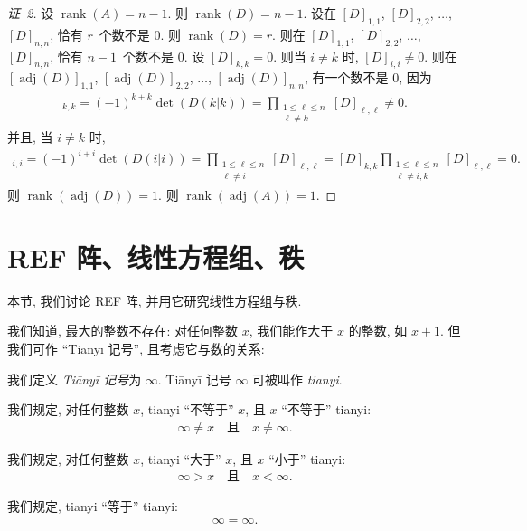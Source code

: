 \documentclass[../libro.tex]{subfiles}
\begin{document}
\begin{proof}[证~2]
    设 \(\operatorname{rank} {(A)} = n - 1\).
    则 \(\operatorname{rank} {(D)} = n - 1\).
    设在
    \([D]_{1,1}\), \([D]_{2,2}\), \(\dots\), \([D]_{n,n}\),
    恰有 \(r\)~个数不是 \(0\).
    则 \(\operatorname{rank} {(D)} = r\).
    则在
    \([D]_{1,1}\), \([D]_{2,2}\), \(\dots\), \([D]_{n,n}\),
    恰有 \(n-1\)~个数不是 \(0\).
    设 \([D]_{k,k} = 0\).
    则当 \(i \neq k\) 时, \([D]_{i,i} \neq 0\).
    则在
    \([\operatorname{adj} {(D)}]_{1,1}\),
    \([\operatorname{adj} {(D)}]_{2,2}\),
    \(\dots\),
    \([\operatorname{adj} {(D)}]_{n,n}\),
    有一个数不是 \(0\), 因为
    \begin{align*}
        [\operatorname{adj} {(D)}]_{k,k}
        = (-1)^{k+k} \det {(D(k|k))}
        = \prod_{\substack{1 \leq \ell \leq n \\ \ell \neq k}}
        {[D]_{\ell,\ell}}
        \neq 0.
    \end{align*}
    并且, 当 \(i \neq k\) 时,
    \begin{align*}
        [\operatorname{adj} {(D)}]_{i,i}
        = (-1)^{i+i} \det {(D(i|i))}
        = \prod_{\substack{1 \leq \ell \leq n \\ \ell \neq i}}
        {[D]_{\ell,\ell}}
        = [D]_{k,k}
        \prod_{\substack{1 \leq \ell \leq n \\ \ell \neq i, k}}
        {[D]_{\ell,\ell}}
        = 0.
    \end{align*}
    则 \(\operatorname{rank} {(\operatorname{adj} {(D)})} = 1\).
    则 \(\operatorname{rank} {(\operatorname{adj} {(A)})} = 1\).
\end{proof}

\section{REF 阵、线性方程组、秩}

本节, 我们讨论 REF 阵,
并用它研究线性方程组与秩.

我们知道, 最大的整数不存在:
对任何整数 \(x\),
我们能作大于 \(x\) 的整数,
如 \(x + 1\).
但我们可作 ``Tiānyī 记号'',
且考虑它与数的关系:

\begin{definition}
    我们定义 \emph{Tiānyī 记号}为 \(\infty\).
    Tiānyī 记号 \(\infty\) 可被叫作 \emph{tianyi}.

    我们规定, 对任何整数 \(x\),
    tianyi ``不等于'' \(x\),
    且 \(x\) ``不等于'' tianyi:
    \begin{align*}
        \infty \neq x
        \quad \text{且} \quad
        x \neq \infty.
    \end{align*}

    我们规定, 对任何整数 \(x\),
    tianyi ``大于'' \(x\),
    且 \(x\) ``小于'' tianyi:
    \begin{align*}
        \infty > x
        \quad \text{且} \quad
        x < \infty.
    \end{align*}

    我们规定, tianyi ``等于'' tianyi:
    \begin{align*}
        \infty = \infty.
    \end{align*}
\end{definition}
\end{document}
